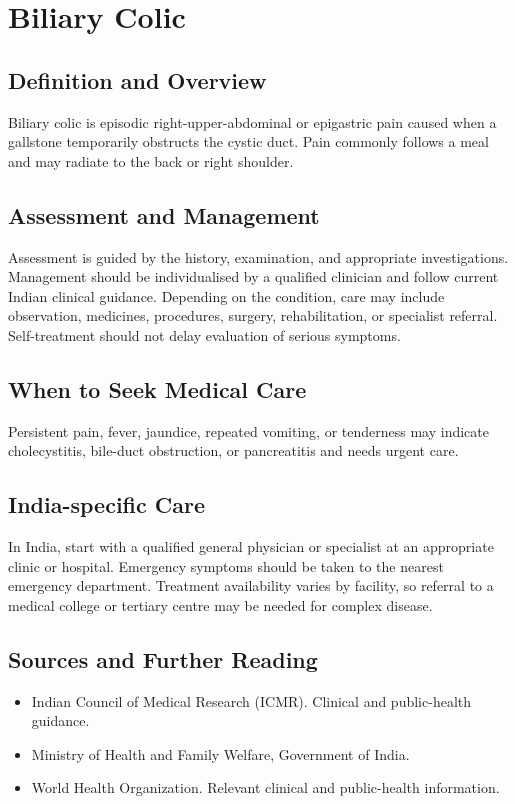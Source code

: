 \chapter{Biliary Colic}

\section*{Definition and Overview}
Biliary colic is episodic right-upper-abdominal or epigastric pain caused when a gallstone temporarily obstructs the cystic duct. Pain commonly follows a meal and may radiate to the back or right shoulder.

\section*{Assessment and Management}
Assessment is guided by the history, examination, and appropriate investigations. Management should be individualised by a qualified clinician and follow current Indian clinical guidance. Depending on the condition, care may include observation, medicines, procedures, surgery, rehabilitation, or specialist referral. Self-treatment should not delay evaluation of serious symptoms.

\section*{When to Seek Medical Care}
Persistent pain, fever, jaundice, repeated vomiting, or tenderness may indicate cholecystitis, bile-duct obstruction, or pancreatitis and needs urgent care.

\section*{India-specific Care}
In India, start with a qualified general physician or specialist at an appropriate clinic or hospital. Emergency symptoms should be taken to the nearest emergency department. Treatment availability varies by facility, so referral to a medical college or tertiary centre may be needed for complex disease.

\section*{Sources and Further Reading}
\begin{itemize}
    \item Indian Council of Medical Research (ICMR). Clinical and public-health guidance.
    \item Ministry of Health and Family Welfare, Government of India.
    \item World Health Organization. Relevant clinical and public-health information.
\end{itemize}

